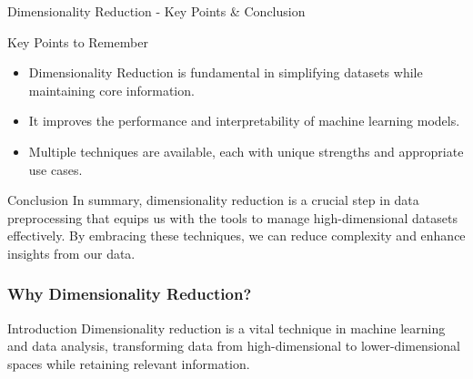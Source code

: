 \documentclass[aspectratio=169]{beamer}
\begin{document}
\begin{frame}[fragile]{Dimensionality Reduction - Key Points & Conclusion}
    \begin{block}{Key Points to Remember}
        \begin{itemize}
            \item Dimensionality Reduction is fundamental in simplifying datasets while maintaining core information.
            \item It improves the performance and interpretability of machine learning models.
            \item Multiple techniques are available, each with unique strengths and appropriate use cases.
        \end{itemize}
    \end{block}

    \begin{block}{Conclusion}
        In summary, dimensionality reduction is a crucial step in data preprocessing that equips us with the tools to manage high-dimensional datasets effectively. By embracing these techniques, we can reduce complexity and enhance insights from our data.
    \end{block}
\end{frame}

\begin{frame}[fragile]
    \frametitle{Why Dimensionality Reduction?}
    \begin{block}{Introduction}
        Dimensionality reduction is a vital technique in machine learning and data analysis, transforming data from high-dimensional to lower-dimensional spaces while retaining relevant information.
    \end{block}
\end{frame}
\end{document}
